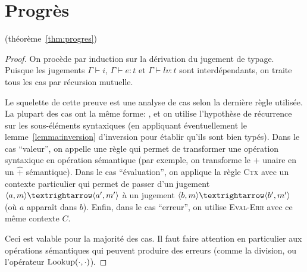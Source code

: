 \section{Progrès}
\label{proof:progres}

(théorème~\ref{thm:progres})

\begin{proof}

On procède par induction sur la dérivation du jugement de typage. Puisque les
jugements $Γ ⊢ i$, $Γ ⊢ e : t$ et $Γ ⊢ lv : t$ sont interdépendants, on traite
tous les cas par récursion mutuelle.

Le squelette de cette preuve est une analyse de cas selon la dernière règle
utilisée. La plupart des cas ont la même forme: , et on utilise l'hypothèse de
récurrence sur les sous-éléments syntaxiques (en appliquant éventuellement le
lemme~\ref{lemma:inversion} d'inversion pour établir qu'ils sont bien typés).
Dans le cas ``valeur'', on appelle une règle qui permet de transformer une
opération syntaxique en opération sémantique (par exemple, on transforme le $+$
unaire en un $\widehat{+}$ sémantique). Dans le cas ``évaluation'', on applique
la règle \textsc{Ctx} avec un contexte particulier qui permet de passer d'un
jugement $\mm{m}{a}{m'}{a'}$ à un jugement $\mm{m}{b}{m'}{b'}$ (où $a$ apparaît
dans $b$). Enfin, dans le cas ``erreur'', on utilise \textsc{Eval-Err} avec ce
même contexte $C$.

Ceci est valable pour la majorité des cas. Il faut faire attention en
particulier aux opérations sémantiques qui peuvent produire des erreurs (comme
la division, ou l'opérateur $\mathrm{Lookup} (\cdot, \cdot)$).





\end{proof}
